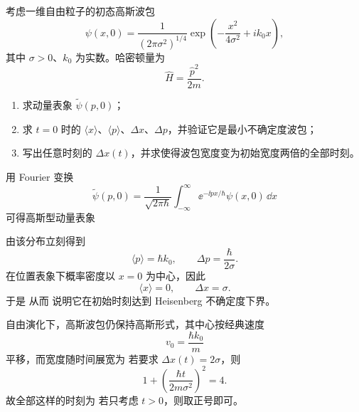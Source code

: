 \begin{question}
考虑一维自由粒子的初态高斯波包
\[
\psi(x,0)=\frac{1}{(2\pi\sigma^2)^{1/4}}\exp\left(-\frac{x^2}{4\sigma^2}+ik_0x\right),
\]
其中 $\sigma>0$、$k_0$ 为实数。哈密顿量为
\[
\hat H=\frac{\hat p^2}{2m}.
\]

\begin{enumerate}[label=(\arabic*),leftmargin=2.5em]
  \item 求动量表象 $\tilde\psi(p,0)$；
  \item 求 $t=0$ 时的 $\langle x\rangle$、$\langle p\rangle$、$\Delta x$、$\Delta p$，并验证它是最小不确定度波包；
  \item 写出任意时刻的 $\Delta x(t)$，并求使得波包宽度变为初始宽度两倍的全部时刻。
\end{enumerate}

\begin{solution}
用 Fourier 变换
\[
\tilde\psi(p,0)=\frac{1}{\sqrt{2\pi\hbar}}\int_{-\infty}^{\infty}\ee^{-\ii px/\hbar}\psi(x,0)\,\dd{x}
\]
可得高斯型动量表象

由该分布立刻得到
\[
\langle p\rangle=\hbar k_0,
\qquad
\Delta p=\frac{\hbar}{2\sigma}.
\]
在位置表象下概率密度以 $x=0$ 为中心，因此
\[
\langle x\rangle=0,
\qquad
\Delta x=\sigma.
\]
于是
从而
说明它在初始时刻达到 Heisenberg 不确定度下界。

自由演化下，高斯波包仍保持高斯形式，其中心按经典速度
\[
v_0=\frac{\hbar k_0}{m}
\]
平移，而宽度随时间展宽为
若要求 $\Delta x(t)=2\sigma$，则
\[
1+\left(\frac{\hbar t}{2m\sigma^2}\right)^2=4.
\]
故全部这样的时刻为
若只考虑 $t>0$，则取正号即可。
\end{solution}
\end{question}

